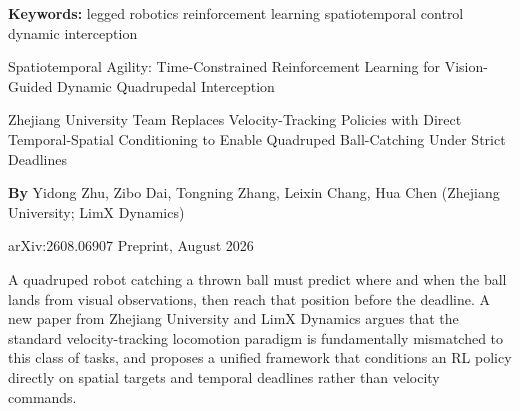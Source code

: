 \documentclass[10pt,twocolumn]{article}
\begin{document}
\setlength{\parindent}{0pt}
\setlength{\parskip}{4pt}

{\small\color{keywordgray}\textbf{Keywords:}
  legged robotics \textbullet{}
  reinforcement learning \textbullet{}
  spatiotemporal control \textbullet{}
  dynamic interception}\par\vspace{4pt}

{\LARGE\bfseries\raggedright
  Spatiotemporal Agility: Time-Constrained Reinforcement
  Learning for Vision-Guided Dynamic Quadrupedal
  Interception}\par\vspace{4pt}

{\large\itshape\raggedright
  Zhejiang University Team Replaces Velocity-Tracking Policies
  with Direct Temporal-Spatial Conditioning to Enable Quadruped
  Ball-Catching Under Strict Deadlines}\par\vspace{6pt}

{\small\textbf{By} Yidong Zhu, Zibo Dai, Tongning Zhang, Leixin Chang, Hua Chen
  (Zhejiang University; LimX Dynamics)}\par\vspace{2pt}

{\small\color{keywordgray}arXiv:2608.06907 \textbullet{} Preprint, August 2026}
\par\vspace{2pt}\noindent{\color{rulered}\rule{\columnwidth}{0.6pt}}\vspace{6pt}

A quadruped robot catching a thrown ball must predict where and when the ball lands
from visual observations, then reach that position before the deadline. A new paper
from Zhejiang University and LimX Dynamics argues that the standard velocity-tracking
locomotion paradigm is fundamentally mismatched to this class of tasks, and proposes
a unified framework that conditions an RL policy directly on spatial targets and
temporal deadlines rather than velocity commands.
\end{document}
